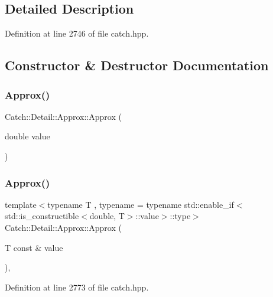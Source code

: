 \subsection{Detailed Description}


Definition at line 2746 of file catch.\+hpp.



\subsection{Constructor \& Destructor Documentation}
\mbox{\label{class_catch_1_1_detail_1_1_approx_a1a8618ea8db08c66bd3d9fe8f74b957a}} 
\subsubsection{Approx()\hspace{0.1cm}{\footnotesize\ttfamily [1/2]}}
{\footnotesize\ttfamily Catch\+::\+Detail\+::\+Approx\+::\+Approx (\begin{DoxyParamCaption}\item[{double}]{value }\end{DoxyParamCaption})\hspace{0.3cm}{\ttfamily [explicit]}}

\mbox{\label{class_catch_1_1_detail_1_1_approx_ab14b979fa8a37f21d037157fabed4072}} 
\subsubsection{Approx()\hspace{0.1cm}{\footnotesize\ttfamily [2/2]}}
{\footnotesize\ttfamily template$<$typename T , typename  = typename std\+::enable\+\_\+if$<$std\+::is\+\_\+constructible$<$double, T$>$\+::value$>$\+::type$>$ \\
Catch\+::\+Detail\+::\+Approx\+::\+Approx (\begin{DoxyParamCaption}\item[{T const \&}]{value }\end{DoxyParamCaption})\hspace{0.3cm}{\ttfamily [inline]}, {\ttfamily [explicit]}}



Definition at line 2773 of file catch.\+hpp.



